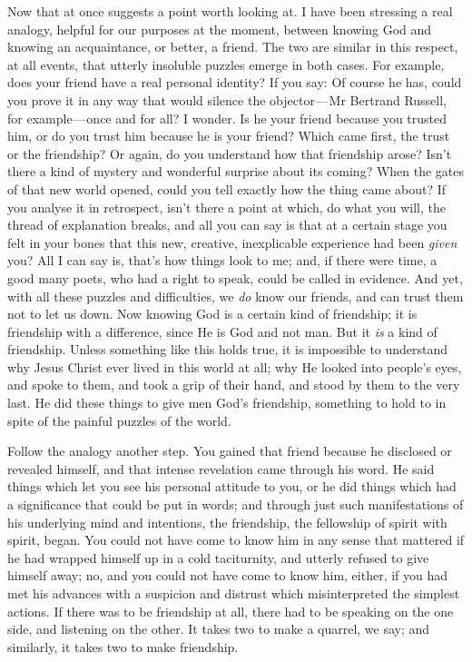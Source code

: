 \documentclass[12pt]{article}
\begin{document}
Now that at once suggests a point worth looking at. I have been
stressing a real analogy, helpful for our purposes at the moment,
between knowing God and knowing an acquaintance, or better, a friend.
The two are similar in this respect, at all events, that utterly
insoluble puzzles emerge in both cases. For example, does your friend
have a real personal identity? If you say: Of course he has, could you
prove it in any way that would silence the objector --- Mr Bertrand
Russell, for example --- once and for all? I wonder. Is he your friend
because you trusted him, or do you trust him because he is your friend?
Which came first, the trust or the friendship? Or again, do you
understand how that friendship arose? Isn't there a kind of mystery and
wonderful surprise about its coming? When the gates of that new world
opened, could you tell exactly how the thing came about? If you analyse
it in retrospect, isn't there a point at which, do what you will, the
thread of explanation breaks, and all you can say is that at a certain
stage you felt in your bones that this new, creative, inexplicable
experience had been \emph{given} you? All I can say is, that's how
things look to me; and, if there were time, a good many poets, who had a
right to speak, could be called in evidence. And yet, with all these
puzzles and difficulties, we \emph{do} know our friends, and can trust
them not to let us down. Now knowing God is a certain kind of
friendship; it is friendship with a difference, since He is God and not
man. But it \emph{is} a kind of friendship. Unless something like this
holds true, it is impossible to understand why Jesus Christ ever lived
in this world at all; why He looked into people's eyes, and spoke to
them, and took a grip of their hand, and stood by them to the very last.
He did these things to give men God's friendship, something to hold to
in spite of the painful puzzles of the world.

Follow the analogy another step. You gained that friend because he
disclosed or revealed himself, and that intense revelation came through
his word. He said things which let you see his personal attitude to you,
or he did things which had a significance that could be put in words;
and through just such manifestations of his underlying mind and
intentions, the friendship, the fellowship of spirit with spirit, began.
You could not have come to know him in any sense that mattered if he had
wrapped himself up in a cold taciturnity, and utterly refused to give
himself away; no, and you could not have come to know him, either, if
you had met his advances with a suspicion and distrust which
misinterpreted the simplest actions. If there was to be friendship at
all, there had to be speaking on the one side, and listening on the
other. It takes two to make a quarrel, we say; and similarly, it takes
two to make friendship.
\end{document}
